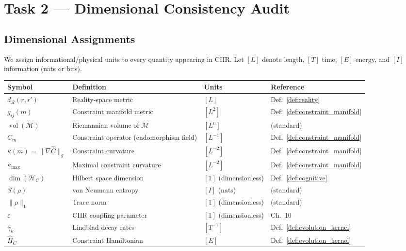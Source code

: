 \documentclass[11pt,a4paper]{article}
\theoremstyle{remark}
\newcommand{\CR}{\mathcal{R}}
\newcommand{\CM}{\mathcal{M}}
\newcommand{\HC}{\mathcal{H}_C}
\newcommand{\hatC}{\hat{C}}
\newcommand{\hatH}{\hat{H}}
\DeclareMathOperator{\vol}{vol}
\begin{document}
\section{Task 2 --- Dimensional Consistency Audit}
\label{sec:dimensions}

\subsection{Dimensional Assignments}

We assign informational/physical units to every quantity appearing in
CIIR.  Let $[L]$ denote length, $[T]$ time, $[E]$ energy, and $[I]$
information (nats or bits).

\begin{center}
\renewcommand{\arraystretch}{1.3}
\begin{tabular}{@{}llll@{}}
\toprule
\textbf{Symbol} & \textbf{Definition} & \textbf{Units} & \textbf{Reference} \\
\midrule
$d_\CR(r, r')$ & Reality-space metric
  & $[L]$ & Def.~\ref{def:reality} \\
$g_{ij}(m)$ & Constraint manifold metric
  & $[L^2]$ & Def.~\ref{def:constraint_manifold} \\
$\vol(\CM)$ & Riemannian volume of $\CM$
  & $[L^n]$ & (standard) \\
$\hatC_m$ & Constraint operator (endomorphism field)
  & $[L^{-1}]$ & Def.~\ref{def:constraint_manifold} \\
$\kappa(m) = \|\nabla\hatC\|_g$ & Constraint curvature
  & $[L^{-2}]$ & Def.~\ref{def:constraint_manifold} \\
$\kappa_{\max}$ & Maximal constraint curvature
  & $[L^{-2}]$ & Def.~\ref{def:constraint_manifold} \\
$\dim(\HC)$ & Hilbert space dimension
  & $[1]$ (dimensionless) & Def.~\ref{def:cognitive} \\
$S(\rho)$ & von Neumann entropy
  & $[I]$ (nats) & (standard) \\
$\|\rho\|_1$ & Trace norm
  & $[1]$ (dimensionless) & (standard) \\
$\varepsilon$ & CIIR coupling parameter
  & $[1]$ (dimensionless) & Ch.~10 \\
$\gamma_k$ & Lindblad decay rates
  & $[T^{-1}]$ & Def.~\ref{def:evolution_kernel} \\
$\hatH_C$ & Constraint Hamiltonian
  & $[E]$ & Def.~\ref{def:evolution_kernel} \\
\bottomrule
\end{tabular}
\end{center}
\end{document}
